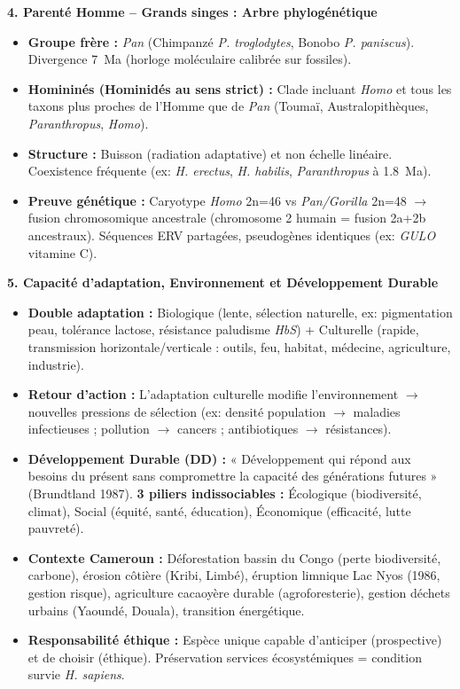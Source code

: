 \documentclass[11pt]{article}
\begin{document}
\begin{bilan}
\textbf{4. Parenté Homme -- Grands singes : Arbre phylogénétique}
\begin{itemize}
    \item \textbf{Groupe frère :} \emph{Pan} (Chimpanzé \emph{P. troglodytes}, Bonobo \emph{P. paniscus}). Divergence \approx \SI{7}{Ma} (horloge moléculaire calibrée sur fossiles).
    \item \textbf{Homininés (Hominidés au sens strict) :} Clade incluant \emph{Homo} et tous les taxons plus proches de l'Homme que de \emph{Pan} (Toumaï, Australopithèques, \emph{Paranthropus}, \emph{Homo}).
    \item \textbf{Structure :} Buisson (radiation adaptative) et non échelle linéaire. Coexistence fréquente (ex: \emph{H. erectus}, \emph{H. habilis}, \emph{Paranthropus} à \approx \SI{1,8}{Ma}).
    \item \textbf{Preuve génétique :} Caryotype \emph{Homo} 2n=46 vs \emph{Pan/Gorilla} 2n=48 $\rightarrow$ fusion chromosomique ancestrale (chromosome 2 humain = fusion 2a+2b ancestraux). Séquences ERV partagées, pseudogènes identiques (ex: \emph{GULO} vitamine C).
\end{itemize}

\textbf{5. Capacité d'adaptation, Environnement et Développement Durable}
\begin{itemize}
    \item \textbf{Double adaptation :} Biologique (lente, sélection naturelle, ex: pigmentation peau, tolérance lactose, résistance paludisme \emph{HbS}) + Culturelle (rapide, transmission horizontale/verticale : outils, feu, habitat, médecine, agriculture, industrie).
    \item \textbf{Retour d'action :} L'adaptation culturelle modifie l'environnement $\rightarrow$ nouvelles pressions de sélection (ex: densité population $\rightarrow$ maladies infectieuses ; pollution $\rightarrow$ cancers ; antibiotiques $\rightarrow$ résistances).
    \item \textbf{Développement Durable (DD) :} « Développement qui répond aux besoins du présent sans compromettre la capacité des générations futures » (Brundtland 1987). \textbf{3 piliers indissociables :} Écologique (biodiversité, climat), Social (équité, santé, éducation), Économique (efficacité, lutte pauvreté).
    \item \textbf{Contexte Cameroun :} Déforestation bassin du Congo (perte biodiversité, carbone), érosion côtière (Kribi, Limbé), éruption limnique Lac Nyos (1986, gestion risque), agriculture cacaoyère durable (agroforesterie), gestion déchets urbains (Yaoundé, Douala), transition énergétique.
    \item \textbf{Responsabilité éthique :} Espèce unique capable d'anticiper (prospective) et de choisir (éthique). Préservation services écosystémiques = condition survie \emph{H. sapiens}.
\end{itemize}


\end{bilan}
\end{document}
